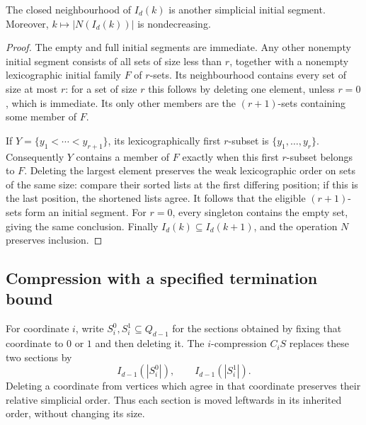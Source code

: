 \begin{lemma}
\label{lem:cube-initial-neighborhood}
The closed neighbourhood of \(I_d(k)\) is another simplicial initial
segment.  Moreover, \(k\mapsto |N(I_d(k))|\) is nondecreasing.
\end{lemma}
\begin{proof}
The empty and full initial segments are immediate.  Any other nonempty
initial segment consists of all sets of size less than \(r\), together
with a nonempty lexicographic initial family \(F\) of \(r\)-sets.
Its neighbourhood contains every set of size at most \(r\): for a set
of size \(r\) this follows by deleting one element, unless \(r=0\),
which is immediate.  Its only other members are the \((r+1)\)-sets
containing some member of \(F\).

If \(Y=\{y_1<\cdots<y_{r+1}\}\), its lexicographically first
\(r\)-subset is \(\{y_1,\ldots,y_r\}\).  Consequently \(Y\) contains
a member of \(F\) exactly when this first \(r\)-subset belongs to \(F\).
Deleting the largest element preserves the weak lexicographic order on
sets of the same size: compare their sorted lists at the first differing
position; if this is the last position, the shortened lists agree.
It follows that the eligible \((r+1)\)-sets form an initial segment.
For \(r=0\), every singleton contains the empty set, giving the same
conclusion.  Finally \(I_d(k)\subseteq I_d(k+1)\), and the operation
\(N\) preserves inclusion.
\end{proof}

\subsection{Compression with a specified termination bound}

For coordinate \(i\), write \(S_i^0,S_i^1\subseteq Q_{d-1}\) for the
sections obtained by fixing that coordinate to \(0\) or \(1\) and
then deleting it.  The \(i\)-compression \(C_iS\) replaces these two
sections by
\[
 I_{d-1}(|S_i^0|),\qquad I_{d-1}(|S_i^1|).
\]
Deleting a coordinate from vertices which agree in that coordinate
preserves their relative simplicial order.  Thus each section is moved
leftwards in its inherited order, without changing its size.

